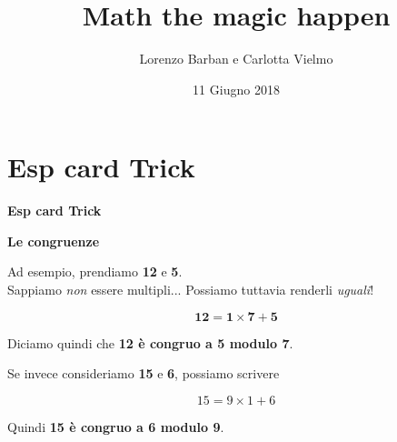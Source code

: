 \documentclass[8pt]{beamer}
\title[Spettacolo di magia]{Math the magic happen}
\author{Lorenzo Barban e Carlotta Vielmo}
\date{11 Giugno 2018}
\institute[]{Università degli Studi di Trento}
\theoremstyle{plain}
\theoremstyle{definition}
\begin{document}
\begin{frame}
\titlepage
\end{frame}

\section{Esp card Trick}
\begin{frame}\begin{center}
\textbf{Esp card Trick}
\end{center}\end{frame}


\begin{frame}


\begin{center}
\textbf{Le congruenze}
\end{center}
\begin{center}
 

\medskip
\bigskip


Ad esempio, prendiamo \textbf{12} e \textbf{5}. \\Sappiamo \emph{non} essere multipli... Possiamo tuttavia renderli \textit{uguali}!

$$ \mathbf{12 = 1\times 7 + 5}$$

\medskip
\smallskip

Diciamo quindi che \textbf{12 è congruo a 5 modulo 7}.
\end{center}
\end{frame}
% 
% 
% 
% 


\begin{frame}
\begin{center}
Se invece consideriamo \textbf{15} e \textbf{6}, possiamo scrivere

$$ 15=9\times 1 + 6$$

\medskip
\smallskip

Quindi \textbf{15 è congruo a 6 modulo 9}.

\end{center}
\end{frame}
\end{document}
